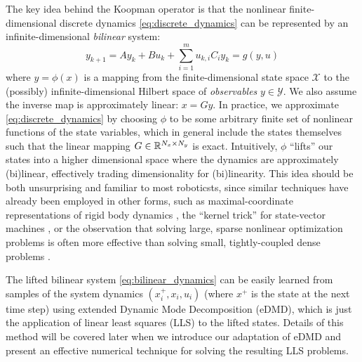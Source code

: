 \documentclass{article}
\begin{document}
The key idea behind the Koopman operator is that the nonlinear finite-dimensional discrete dynamics 
\eqref{eq:discrete_dynamics} can be represented by an infinite-dimensional \textit{bilinear} system:
\begin{equation} \label{eq:bilinear_dynamics}
    y_{k+1} = A y_k + B u_k + \sum_{i=1}^m u_{k,i} C_i y_k = g(y,u)
\end{equation}
where $y = \phi(x)$ is a mapping from the finite-dimensional state space $\mathcal{X}$ to the (possibly) 
infinite-dimensional Hilbert space of \textit{observables} $y \in \mathcal{Y}$. We also assume the inverse 
map is approximately linear: $x = G y$. In practice, we approximate
\eqref{eq:discrete_dynamics} by choosing $\phi$ to be some arbitrary finite set of nonlinear functions 
of the state variables, which in general include the states themselves such that the linear mapping 
$G \in \mathbb{R}^{N_x \times N_y}$ is  exact. 
Intuitively, $\phi$ ``lifts'' our states into a higher dimensional space where 
the dynamics are approximately (bi)linear, effectively trading dimensionality for (bi)linearity. This idea 
should be both unsurprising and familiar to most roboticsts, since similar techniques have already been 
employed in other forms, such as maximal-coordinate representations of rigid body dynamics 
, the ``kernel trick'' for state-vector machines , or the observation
that solving large, sparse nonlinear optimization problems is often more effective than solving small,
tightly-coupled dense problems .

The lifted bilinear system \eqref{eq:bilinear_dynamics} can be easily learned from samples of the system 
dynamics $(x_i^+,x_i,u_i)$ (where $x^+$ is the state at the next time step) using extended Dynamic Mode 
Decomposition (eDMD), which is just the application of linear least squares (LLS) to the lifted states.
Details of this method will be covered later when we introduce our adaptation of eDMD and present an 
effective numerical technique for solving the resulting LLS problems.

\end{document}
